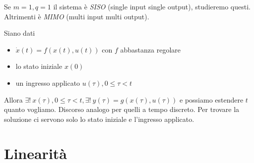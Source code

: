 \documentclass[10pt,a4paper]{book}
\begin{document}
Se $m=1,q=1$ il sistema è \textit{SISO} (single input single output), studieremo questi. Altrimenti è \textit{MIMO} (multi input multi output).

Siano dati
\begin{itemize}
	\item $\dot{x}(t) =f(x(t) ,u(t))$ con $f$ abbastanza regolare
	\item lo stato iniziale $x(0)$
	\item un ingresso applicato $u(\tau) ,0\leqslant \tau < t$
\end{itemize}

Allora $\exists !\ x(\tau) ,0\leqslant \tau < t,\exists !\ y(\tau) =g(x(\tau) ,u(\tau))$ e possiamo estendere $t$ quanto vogliamo. Discorso analogo per quelli a tempo discreto. Per trovare la soluzione ci servono solo lo stato iniziale e l'ingresso applicato.
\section{Linearità}
\end{document}
